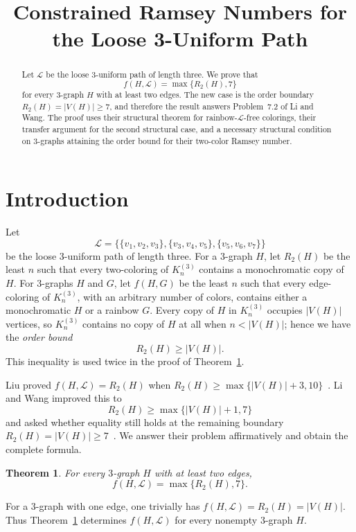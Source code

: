 \documentclass[11pt]{amsart}
\title[Constrained Ramsey numbers for the loose path]{Constrained Ramsey Numbers for the Loose 3-Uniform Path}
\date{}
\newtheorem{theorem}{Theorem}
\newcommand{\Lpath}{\mathcal L}
\begin{document}
\begin{abstract}
Let $\Lpath$ be the loose $3$-uniform path of length three. We prove that
\[
  f(H,\Lpath)=\max\{R_2(H),7\}
\]
for every $3$-graph $H$ with at least two edges. The new case is the order
boundary $R_2(H)=|V(H)|\ge 7$, and therefore the result answers
Problem~7.2 of Li and Wang. The proof uses their structural theorem for
rainbow-$\Lpath$-free colorings, their transfer argument for the second
structural case, and a necessary structural condition on $3$-graphs
attaining the order bound for their two-color Ramsey number.
\end{abstract}

\maketitle

\section{Introduction}

Let
\[
\Lpath=
\bigl\{
  \{v_1,v_2,v_3\},
  \{v_3,v_4,v_5\},
  \{v_5,v_6,v_7\}
\bigr\}
\]
be the loose $3$-uniform path of length three. For a $3$-graph $H$, let
$R_2(H)$ be the least $n$ such that every two-coloring of $K_n^{(3)}$
contains a monochromatic copy of $H$. For $3$-graphs $H$ and $G$, let
$f(H,G)$ be the least $n$ such that every edge-coloring of $K_n^{(3)}$,
with an arbitrary number of colors, contains either a monochromatic $H$
or a rainbow $G$. Every copy of $H$ in $K_n^{(3)}$ occupies $|V(H)|$
vertices, so $K_n^{(3)}$ contains no copy of $H$ at all when
$n<|V(H)|$; hence we have the \emph{order bound}
\[
  R_2(H)\ge|V(H)|.
\]
This inequality is used twice in the proof of Theorem~\ref{thm:main}.

Liu proved $f(H,\Lpath)=R_2(H)$ when
$R_2(H)\ge\max\{|V(H)|+3,10\}$~\cite{Liu}. Li and Wang improved this to
\[
  R_2(H)\ge\max\{|V(H)|+1,7\}
\]
and asked whether equality still holds at the remaining boundary
$R_2(H)=|V(H)|\ge7$~\cite[Theorem~1.10 and Problem~7.2]{LiWang}.
We answer their problem affirmatively and obtain the complete formula.

\begin{theorem}\label{thm:main}
For every $3$-graph $H$ with at least two edges,
\[
  f(H,\Lpath)=\max\{R_2(H),7\}.
\]
\end{theorem}

For a $3$-graph with one edge, one trivially has
$f(H,\Lpath)=R_2(H)=|V(H)|$. Thus Theorem~\ref{thm:main} determines
$f(H,\Lpath)$ for every nonempty $3$-graph $H$.
\end{document}
